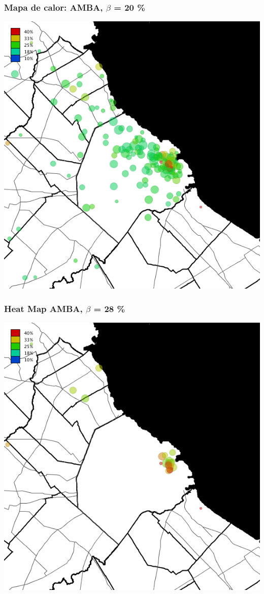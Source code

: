 \documentclass{beamer}
\begin{document}
\begin{frame}
	\frametitle{Mapa de calor: AMBA, $\beta$ = 20 \%}
	\centering
	\includegraphics[height=.9\textheight,width = .9\columnwidth,keepaspectratio]
	{slides/201112_hi_res_amba_usuarios_proporcion_circulos_beta20.png}
\end{frame}
\begin{frame}
	\frametitle{Heat Map AMBA, $\beta$ = 28 \%}
	\centering
	\includegraphics[height=.9\textheight,width = .9\columnwidth,keepaspectratio]
	{slides/201112_hi_res_amba_usuarios_proporcion_circulos_beta28.png}
\end{frame}
\end{document}
